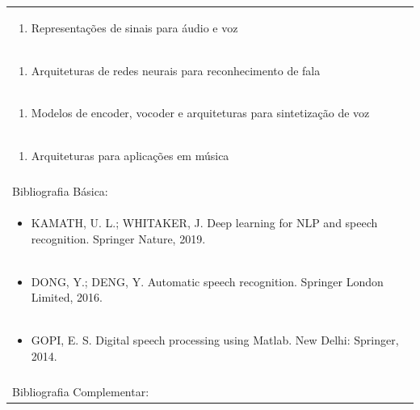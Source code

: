 \documentclass[11pt]{article}
\begin{document}
\begin{center}
\begin{longtable}{|p{4cm}|p{4cm}|p{4cm}|p{4cm}|}
\multicolumn{4}{|p{\dimexpr 16cm + 6\tabcolsep\relax}|}{\begin{enumerate}[start=2]\item Representações de sinais para áudio e voz\end{enumerate}}\\
\multicolumn{4}{|p{\dimexpr 16cm + 6\tabcolsep\relax}|}{\begin{enumerate}[start=3]\item Arquiteturas de redes neurais para reconhecimento de fala\end{enumerate}}\\
\multicolumn{4}{|p{\dimexpr 16cm + 6\tabcolsep\relax}|}{\begin{enumerate}[start=4]\item Modelos de encoder, vocoder e arquiteturas para sintetização de voz\end{enumerate}}\\
\multicolumn{4}{|p{\dimexpr 16cm + 6\tabcolsep\relax}|}{\begin{enumerate}[start=5]\item Arquiteturas para aplicações em música\end{enumerate}}\\
\multicolumn{4}{|p{\dimexpr 16cm + 6\tabcolsep\relax}|}{}\\
\hline
\multicolumn{4}{|p{16cm}|}{Bibliografia Básica:}\\*
\multicolumn{4}{|p{\dimexpr 16cm + 6\tabcolsep\relax}|}{\begin{itemize}\item KAMATH, U. L.; WHITAKER, J. Deep learning for NLP and speech recognition. Springer Nature, 2019.\end{itemize}}\\
\multicolumn{4}{|p{\dimexpr 16cm + 6\tabcolsep\relax}|}{\begin{itemize}\item DONG, Y.; DENG, Y. Automatic speech recognition. Springer London Limited, 2016.\end{itemize}}\\
\multicolumn{4}{|p{\dimexpr 16cm + 6\tabcolsep\relax}|}{\begin{itemize}\item GOPI, E. S. Digital speech processing using Matlab. New Delhi: Springer, 2014.\end{itemize}}\\
\multicolumn{4}{|p{16cm}|}{}\\
\hline
\multicolumn{4}{|p{16cm}|}{Bibliografia Complementar:}\\*

\end{longtable}
\end{center}
\end{document}
